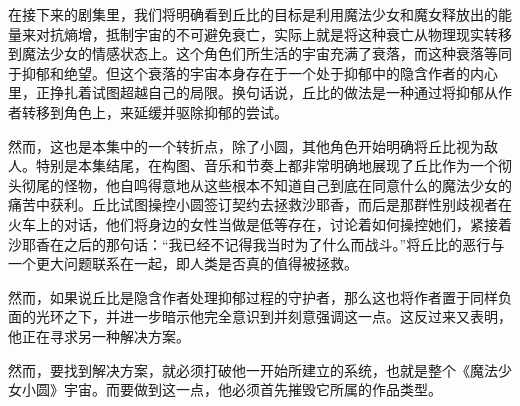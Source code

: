 在接下来的剧集里，我们将明确看到丘比的目标是利用魔法少女和魔女释放出的能量来对抗熵增，抵制宇宙的不可避免衰亡，实际上就是将这种衰亡从物理现实转移到魔法少女的情感状态上。这个角色们所生活的宇宙充满了衰落，而这种衰落等同于抑郁和绝望。但这个衰落的宇宙本身存在于一个处于抑郁中的隐含作者的内心里，正挣扎着试图超越自己的局限。换句话说，丘比的做法是一种通过将抑郁从作者转移到角色上，来延缓并驱除抑郁的尝试。

然而，这也是本集中的一个转折点，除了小圆，其他角色开始明确将丘比视为敌人。特别是本集结尾，在构图、音乐和节奏上都非常明确地展现了丘比作为一个彻头彻尾的怪物，他自鸣得意地从这些根本不知道自己到底在同意什么的魔法少女的痛苦中获利。丘比试图操控小圆签订契约去拯救沙耶香，而后是那群性别歧视者在火车上的对话，他们将身边的女性当做是低等存在，讨论着如何操控她们，紧接着沙耶香在之后的那句话：“我已经不记得我当时为了什么而战斗。”将丘比的恶行与一个更大问题联系在一起，即人类是否真的值得被拯救。

然而，如果说丘比是隐含作者处理抑郁过程的守护者，那么这也将作者置于同样负面的光环之下，并进一步暗示他完全意识到并刻意强调这一点。这反过来又表明，他正在寻求另一种解决方案。

然而，要找到解决方案，就必须打破他一开始所建立的系统，也就是整个《魔法少女小圆》宇宙。而要做到这一点，他必须首先摧毁它所属的作品类型。
